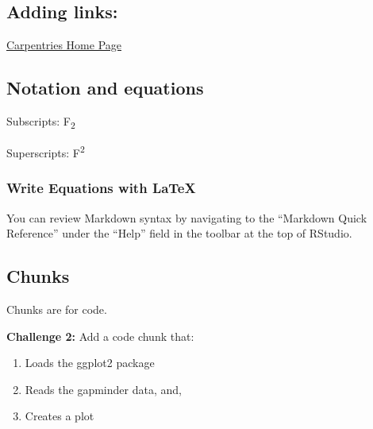 \documentclass[
]{article}
\makeatletter
\newcommand*\pandocbounded[1]{%
  \sbox\pandoc@box{#1}%
  \Gscale@div\@tempa{\textheight}{\dimexpr\ht\pandoc@box+\dp\pandoc@box\relax}%
  \Gscale@div\@tempb{\linewidth}{\wd\pandoc@box}%
  \ifdim\@tempb\p@<\@tempa\p@\let\@tempa\@tempb\fi%
  \ifdim\@tempa\p@<\p@\scalebox{\@tempa}{\usebox\pandoc@box}%
  \else\usebox{\pandoc@box}%
  \fi%
}
\makeatother
\begin{document}
\subsection{Adding links:}\label{adding-links}

\href{https://carpentries.org/}{Carpentries Home Page}

\pandocbounded{}

\subsection{Notation and equations}\label{notation-and-equations}

Subscripts: F\textsubscript{2}

Superscripts: F\textsuperscript{2}

\subsubsection{Write Equations with
LaTeX}\label{write-equations-with-latex}

You can review Markdown syntax by navigating to the ``Markdown Quick
Reference'' under the ``Help'' field in the toolbar at the top of
RStudio.

\subsection{Chunks}\label{chunks}

Chunks are for code.

\textbf{Challenge 2:} Add a code chunk that:

\begin{enumerate}
\def\labelenumi{\arabic{enumi}.}
\item
  Loads the ggplot2 package
\item
  Reads the gapminder data, and,
\item
  Creates a plot
\end{enumerate}
\end{document}
